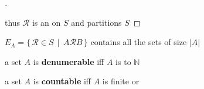 \documentclass{article}
\newcommand{\spaced}[1]{\, #1 \,}
\newcommand{\buildset}[2]{\{\spaced{#1} \mid \spaced{#2} \}}
\begin{document}
\begin{definition}[equinumerous]
\begin{proof}[\unskip\nopunct]
\begin{enumerate}[label={\arabic*)}, partopsep=1em, itemsep=0.25em, left=6em]
                \end{enumerate}
                
                \vspace{1em}
                \tab thus $\mathcal{R}$ is an  on $S$ and partitions $S$
                \end{proof}
                
                \begin{note}
                    \hspace{0em}\vspace{0.5em}
                    \tab $E_A = \buildset{\mathcal{R} \in S}{A\mathcal{R}B}$ contains all the \newline
                    \tab\tab sets of size $|A|$
                \end{note}
                
        \end{definition}
        
        \begin{definition}[denumerable]\label{denumerable}
            a set $A$ is \textbf{denumerable} iff $A$ is  to $\mathbb{N}$
        \end{definition}
        
        \begin{definition}[countable]\label{countable}
            a set $A$ is \textbf{countable} iff $A$ is finite or 
        \end{definition}
        
\end{document}
